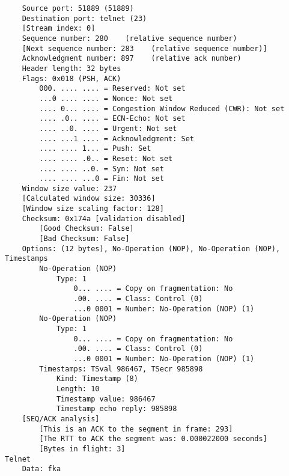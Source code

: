 \begin{lstlisting}
    Source port: 51889 (51889)
    Destination port: telnet (23)
    [Stream index: 0]
    Sequence number: 280    (relative sequence number)
    [Next sequence number: 283    (relative sequence number)]
    Acknowledgment number: 897    (relative ack number)
    Header length: 32 bytes
    Flags: 0x018 (PSH, ACK)
        000. .... .... = Reserved: Not set
        ...0 .... .... = Nonce: Not set
        .... 0... .... = Congestion Window Reduced (CWR): Not set
        .... .0.. .... = ECN-Echo: Not set
        .... ..0. .... = Urgent: Not set
        .... ...1 .... = Acknowledgment: Set
        .... .... 1... = Push: Set
        .... .... .0.. = Reset: Not set
        .... .... ..0. = Syn: Not set
        .... .... ...0 = Fin: Not set
    Window size value: 237
    [Calculated window size: 30336]
    [Window size scaling factor: 128]
    Checksum: 0x174a [validation disabled]
        [Good Checksum: False]
        [Bad Checksum: False]
    Options: (12 bytes), No-Operation (NOP), No-Operation (NOP), Timestamps
        No-Operation (NOP)
            Type: 1
                0... .... = Copy on fragmentation: No
                .00. .... = Class: Control (0)
                ...0 0001 = Number: No-Operation (NOP) (1)
        No-Operation (NOP)
            Type: 1
                0... .... = Copy on fragmentation: No
                .00. .... = Class: Control (0)
                ...0 0001 = Number: No-Operation (NOP) (1)
        Timestamps: TSval 986467, TSecr 985898
            Kind: Timestamp (8)
            Length: 10
            Timestamp value: 986467
            Timestamp echo reply: 985898
    [SEQ/ACK analysis]
        [This is an ACK to the segment in frame: 293]
        [The RTT to ACK the segment was: 0.000022000 seconds]
        [Bytes in flight: 3]
Telnet
    Data: fka

\end{lstlisting}